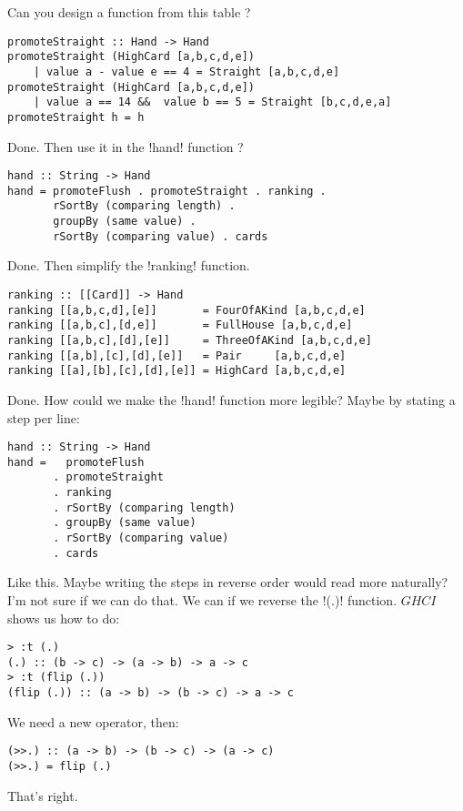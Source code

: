 \lhN Can you design a function from this table ?
\lhA
\begin{lstlisting}[frame=single]
promoteStraight :: Hand -> Hand
promoteStraight (HighCard [a,b,c,d,e]) 
    | value a - value e == 4 = Straight [a,b,c,d,e]
promoteStraight (HighCard [a,b,c,d,e]) 
    | value a == 14 &&  value b == 5 = Straight [b,c,d,e,a]
promoteStraight h = h
\end{lstlisting}
\success Done.
\lhN Then use it in the \il!hand! function ?
\lhA
\begin{lstlisting}[frame=single]
hand :: String -> Hand
hand = promoteFlush . promoteStraight . ranking . 
       rSortBy (comparing length) .
       groupBy (same value) . 
       rSortBy (comparing value) . cards
\end{lstlisting}
\success Done.
\lhN Then simplify the \il!ranking! function.
\lhA
\begin{lstlisting}[frame=single]
ranking :: [[Card]] -> Hand
ranking [[a,b,c,d],[e]]       = FourOfAKind [a,b,c,d,e]
ranking [[a,b,c],[d,e]]       = FullHouse [a,b,c,d,e]
ranking [[a,b,c],[d],[e]]     = ThreeOfAKind [a,b,c,d,e]
ranking [[a,b],[c],[d],[e]]   = Pair     [a,b,c,d,e]
ranking [[a],[b],[c],[d],[e]] = HighCard [a,b,c,d,e] 
\end{lstlisting}
\success Done.
\lhN How could we make the \il!hand! function more legible?
\lhA Maybe by stating a step per line:
\begin{lstlisting}[frame=single]
hand :: String -> Hand
hand =   promoteFlush    
       . promoteStraight
       . ranking 
       . rSortBy (comparing length)
       . groupBy (same value)
       . rSortBy (comparing value)
       . cards                     
\end{lstlisting}
\success Like this.
\lhN Maybe writing the steps in reverse order would read more naturally?
\lhA I'm not sure if we can do that.
\newpage
\lhN We can if we reverse the \il!(.)! function. $GHCI$ shows us how to do:
\begin{small}
\begin{verbatim}
> :t (.)
(.) :: (b -> c) -> (a -> b) -> a -> c
> :t (flip (.))
(flip (.)) :: (a -> b) -> (b -> c) -> a -> c
\end{verbatim}
\end{small}
\hspace*{\fill}
\lhA We need a new operator, then:
\begin{lstlisting}[frame=single]
(>>.) :: (a -> b) -> (b -> c) -> (a -> c)
(>>.) = flip (.)
\end{lstlisting}
\lhN That's right.
